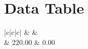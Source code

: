 \documentclass[a4paper,12pt]{article}
\begin{document}
	\section{Data Table}
		\begin{table}[H]
		\centering
		\caption{Readings of  Terminal Voltage ($V_T$) and Load Current ($I_L$)}
		\begin{subtable}[t]{0.45\textwidth} %
			\centering
			\begin{tabular}{|c|c|c|}
			\hline
			 &  &  \\                                                                                & 220.00                                                                                         & 0.00                                                                                      \\ \hline
			

\end{tabular}
\end{subtable}
\end{table}
\end{document}

